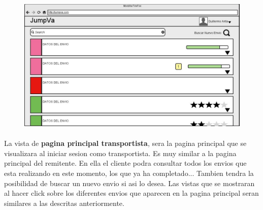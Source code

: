 \documentclass[10pt, a4paper,spanish]{article}
\begin{document}
			\begin{figure}[H]
				\centering
				\begin{minipage}[b]{0.7\textwidth}
					\includegraphics[width=\textwidth]{res/PaginaPrincipalTransportista.png}

				\end{minipage}
			\end{figure}
			
			\paragraph{}
			La vista de \textbf{pagina principal transportista}, sera la pagina principal que se visualizara al iniciar sesion como transportista. Es muy similar a la pagina principal del remitente. En ella el cliente podra consultar todos los envios que esta realizando en este momento, los que ya ha completado... Tambien tendra la posibilidad de buscar un nuevo envio si asi lo desea. Las vistas que se mostraran al hacer click sobre los diferentes envios que aparecen en la pagina principal seran similares a las descritas anteriormente.
\end{document}
